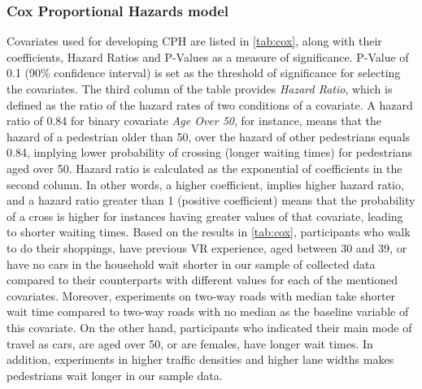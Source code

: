 \subsubsection{Cox Proportional Hazards model}
Covariates used for developing CPH are listed in \cref{tab:cox}, along with their coefficients, Hazard Ratios and P-Values as a measure of significance. P-Value of 0.1 (90\% confidence interval) is set as the threshold of significance for selecting the covariates. The third column of the table provides \textit{Hazard Ratio}, which is defined as the ratio of the hazard rates of two conditions of a covariate. A hazard ratio of 0.84 for binary covariate \textit{Age Over 50}, for instance, means that the hazard of a pedestrian older than 50, over the hazard of other pedestrians equals 0.84, implying lower probability of crossing (longer waiting times) for pedestrians aged over 50. Hazard ratio is calculated as the exponential of coefficients in the second column. In other words, a higher coefficient, implies higher hazard ratio, and a hazard ratio greater than 1 (positive coefficient) means that the probability of a cross is higher for instances having greater values of that covariate, leading to shorter waiting times. Based on the results in \cref{tab:cox}, participants who walk to do their shoppings, have previous VR experience, aged between 30 and 39, or have no cars in the household wait shorter in our sample of collected data compared to their counterparts with different values for each of the mentioned covariates. Moreover, experiments on two-way roads with median take shorter wait time compared to two-way roads with no median as the baseline variable of this covariate. On the other hand, participants who indicated their main mode of travel as cars, are aged over 50, or are females, have longer wait times. In addition, experiments in higher traffic densities and higher lane widths makes pedestrians wait longer in our sample data.

